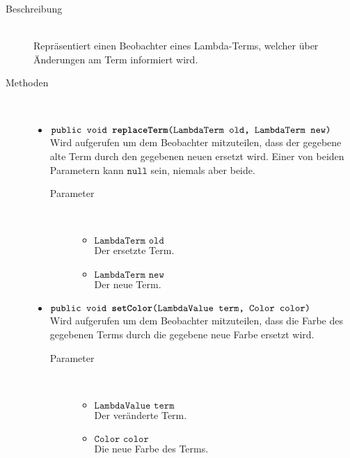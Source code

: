 \begin{description}
\item[Beschreibung] \hfill \\ Repräsentiert einen Beobachter eines Lambda-Terms, welcher über Änderungen am Term informiert wird.

\item[Methoden] \hfill \\
	\vspace{-.8cm}
	\begin{itemize}
		\item $\texttt{public void \textbf{replaceTerm}(LambdaTerm old, LambdaTerm new)}$ \\ Wird aufgerufen um dem Beobachter mitzuteilen, dass der gegebene alte Term durch den gegebenen neuen ersetzt wird. Einer von beiden Parametern kann $\texttt{null}$ sein, niemals aber beide.
		\begin{description}
			\item[Parameter] \hfill \\
			\vspace{-.8cm}
			\begin{itemize}
				\item $\texttt{LambdaTerm old}$ \\ Der ersetzte Term.
				\item $\texttt{LambdaTerm new}$ \\ Der neue Term.
			\end{itemize}
		\end{description}
		
		\item $\texttt{public void \textbf{setColor}(LambdaValue term, Color color)}$ \\ Wird aufgerufen um dem Beobachter mitzuteilen, dass die Farbe des gegebenen Terms durch die gegebene neue Farbe ersetzt wird.
		\begin{description}
			\item[Parameter] \hfill \\
			\vspace{-.8cm}
			\begin{itemize}
				\item $\texttt{LambdaValue term}$ \\ Der veränderte Term.
				\item $\texttt{Color color}$ \\ Die neue Farbe des Terms.
			\end{itemize}
		\end{description}
	\end{itemize}
\end{description}

